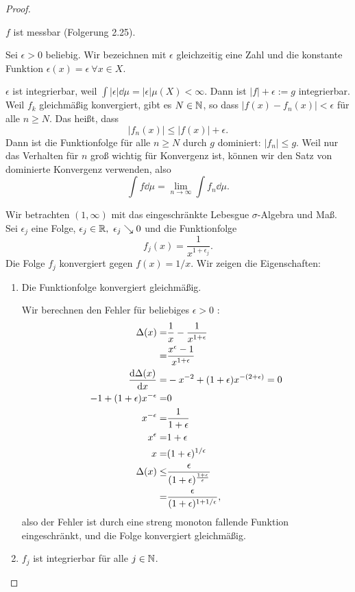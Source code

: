 \begin{proof}
	\begin{parts}
	\item $f$ ist messbar (Folgerung 2.25).

	Sei $\epsilon>0$ beliebig. Wir bezeichnen mit $\epsilon$ gleichzeitig eine Zahl und die konstante Funktion $\epsilon(x)=\epsilon~\forall x\in X$. 

	$\epsilon$ ist integrierbar, weil $\int |\epsilon|\dd{\mu}=|\epsilon|\mu(X)<\infty$. Dann ist $|f|+\epsilon:= g$ integrierbar. Weil $f_k$ gleichmäßig konvergiert, gibt es $N\in \mathbb{N}$, so dass $|f(x)-f_n(x)|<\epsilon$ f\"{u}r alle $n\ge N$. Das heißt, dass
	\[
	|f_n(x)|\le |f(x)|+\epsilon
	.\] 
	Dann ist die Funktionfolge f\"{u}r alle $n\ge N$ durch $g$ dominiert: $|f_n|\le g$. Weil nur das Verhalten f\"{u}r $n$ groß wichtig f\"{u}r Konvergenz ist, können wir den Satz von dominierte Konvergenz verwenden, also 
	\[
		\int f\dd{\mu}=\lim_{n \to \infty} \int f_n\dd{\mu}
	.\] 
\item Wir betrachten $(1,\infty)$ mit das eingeschränkte Lebesgue $\sigma$-Algebra und Maß. Sei $\epsilon_j$ eine Folge, $\epsilon_j\in \mathbb{R},~\epsilon_j\searrow 0$ und die Funktionfolge
	\[
		f_j(x)=\frac{1}{x^{1+\epsilon_j}}
	.\] 
	Die Folge $f_j$ konvergiert gegen $f(x) = 1 / x$. Wir zeigen die Eigenschaften:
	\begin{enumerate}[label=(\roman*)]
		\item Die Funktionfolge konvergiert gleichmäßig.

			Wir berechnen den Fehler f\"{u}r beliebiges $\epsilon>0$ :
			\begin{align*}
				\Delta(x)=&\frac{1}{x}-\frac{1}{x^{1+\epsilon}}\\
				=&\frac{x^{\epsilon}-1}{x^{1+\epsilon}}\\
				\dv{\Delta(x)}{x}=&-x^{-2}+(1+\epsilon)x^{-(2+\epsilon)}=0\\
				-1+(1+\epsilon)x^{-\epsilon}=&0\\
				x^{-\epsilon}=&\frac{1}{1+\epsilon}\\
				x^{\epsilon}=&1+\epsilon\\
				x=&(1+\epsilon)^{1 / \epsilon}\\
				\Delta(x)\le& \frac{\epsilon}{(1+\epsilon)^{\frac{1 + \epsilon}{\epsilon}}}\\
				=& \frac{\epsilon}{(1+\epsilon)^{1+1 /\epsilon}},
			\end{align*}
			also der Fehler ist durch eine streng monoton fallende Funktion eingeschränkt, und die Folge konvergiert gleichmäßig.
		\item $f_j$ ist integrierbar f\"{u}r alle $j\in \mathbb{N}$.


\end{enumerate}
\end{parts}
\end{proof}
